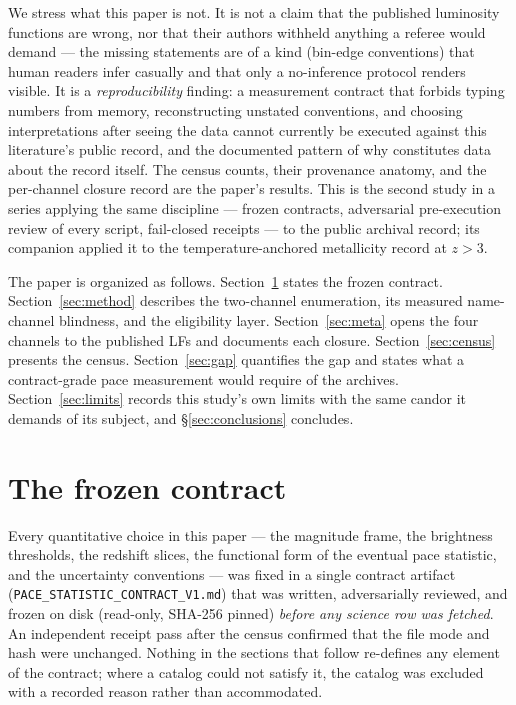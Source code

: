 \documentclass[twocolumn]{aastex702}
\begin{document}
We stress what this paper is not. It is not a claim that the published luminosity
functions are wrong, nor that their authors withheld anything a referee would demand ---
the missing statements are of a kind (bin-edge conventions) that human readers infer
casually and that only a no-inference protocol renders visible. It is a
\emph{reproducibility} finding: a measurement contract that forbids typing numbers from
memory, reconstructing unstated conventions, and choosing interpretations after seeing
the data cannot currently be executed against this literature's public record, and the
documented pattern of why constitutes data about the record itself. The census counts,
their provenance anatomy, and the per-channel closure record are the paper's results.
This is the second study in a series applying the same discipline --- frozen contracts,
adversarial pre-execution review of every script, fail-closed receipts --- to the public
archival record; its companion applied it to the temperature-anchored metallicity record
at $z>3$.

The paper is organized as follows. Section~\ref{sec:contract} states the frozen contract.
Section~\ref{sec:method} describes the two-channel enumeration, its measured name-channel
blindness, and the eligibility layer. Section~\ref{sec:meta} opens the four channels to
the published LFs and documents each closure. Section~\ref{sec:census} presents the
census. Section~\ref{sec:gap} quantifies the gap and states what a contract-grade pace
measurement would require of the archives. Section~\ref{sec:limits} records this study's
own limits with the same candor it demands of its subject, and \S\ref{sec:conclusions}
concludes.

\section{The frozen contract} \label{sec:contract}

Every quantitative choice in this paper --- the magnitude frame, the brightness
thresholds, the redshift slices, the functional form of the eventual pace statistic, and
the uncertainty conventions --- was fixed in a single contract artifact
(\texttt{PACE\_STATISTIC\_CONTRACT\_V1.md}) that was written, adversarially reviewed, and
frozen on disk (read-only, SHA-256 pinned) \emph{before any science row was fetched}. An
independent receipt pass after the census confirmed that the file mode and hash were
unchanged. Nothing in the sections that follow re-defines any element of the contract;
where a catalog could not satisfy it, the catalog was excluded with a recorded reason
rather than accommodated.
\end{document}

